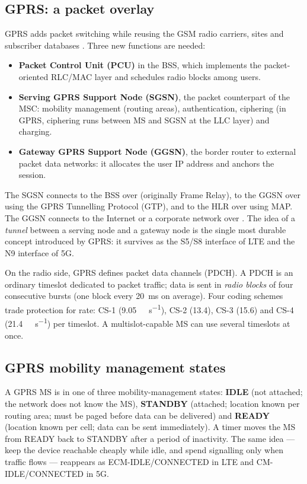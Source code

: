 \documentclass[11pt,a4paper]{article}
\begin{document}
\subsection{GPRS: a packet overlay}
GPRS adds packet switching while reusing the GSM radio carriers, sites and
subscriber databases \cite{ts23060}. Three new functions are needed:
\begin{itemize}
  \item \textbf{Packet Control Unit (PCU)} in the BSS, which implements the
        packet-oriented RLC/MAC layer and schedules radio blocks among users.
  \item \textbf{Serving GPRS Support Node (SGSN)}, the packet counterpart of the MSC:
        mobility management (routing areas), authentication, ciphering (in GPRS,
        ciphering runs between MS and SGSN at the LLC layer) and charging.
  \item \textbf{Gateway GPRS Support Node (GGSN)}, the border router to external
        packet data networks: it allocates the user IP address and anchors the session.
\end{itemize}
The SGSN connects to the BSS over  (originally Frame Relay), to the GGSN
over  using the GPRS Tunnelling Protocol (GTP), and to the HLR over
 using MAP. The GGSN connects to the Internet or a corporate network over
. The idea of a \emph{tunnel} between a serving node and a gateway node is
the single most durable concept introduced by GPRS: it survives as the S5/S8
interface of LTE and the N9 interface of 5G.

On the radio side, GPRS defines packet data channels (PDCH). A PDCH is an ordinary
timeslot dedicated to packet traffic; data is sent in \emph{radio blocks} of four
consecutive bursts (one block every \qty{20}{\milli\second} on average). Four coding
schemes trade protection for rate:
CS-1 (\qty{9.05}{\kilo\bit\per\second}), CS-2 (13.4), CS-3 (15.6) and CS-4
(\qty{21.4}{\kilo\bit\per\second}) per timeslot. A multislot-capable MS can use
several timeslots at once.

\subsection{GPRS mobility management states}
A GPRS MS is in one of three mobility-management states:
\textbf{IDLE} (not attached; the network does not know the MS),
\textbf{STANDBY} (attached; location known per routing area; must be paged before
data can be delivered) and \textbf{READY} (location known per cell; data can be sent
immediately). A timer moves the MS from READY back to STANDBY after a period of
inactivity. The same idea --- keep the device reachable cheaply while idle, and
spend signalling only when traffic flows --- reappears as ECM-IDLE/CONNECTED in LTE and
CM-IDLE/CONNECTED in 5G.
\end{document}
